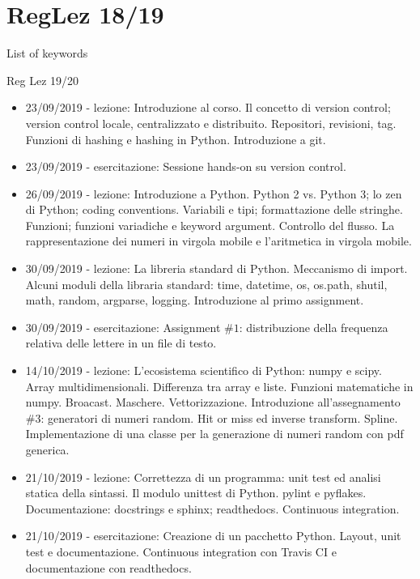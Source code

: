 \section{RegLez 18/19}

\begin{frame}[allowframebreaks]{List of keywords}
\listofkeywords
\end{frame}

\begin{frame}[allowframebreaks]{Reg Lez 19/20}
\begin{itemize}
\item 23/09/2019 - lezione: Introduzione al corso. Il concetto di version control; version control locale, centralizzato e distribuito. Repositori, revisioni, tag. Funzioni di hashing e hashing in Python. Introduzione a git.
\item 23/09/2019 - esercitazione: Sessione hands-on su version control.
\item 26/09/2019 - lezione: Introduzione a Python. Python 2 vs. Python 3; lo zen di Python; coding conventions. Variabili e tipi; formattazione delle stringhe. Funzioni; funzioni variadiche e keyword argument. Controllo del flusso. La rappresentazione dei numeri in virgola mobile e l'aritmetica in virgola mobile.
\item 30/09/2019 - lezione: La libreria standard di Python. Meccanismo di import. Alcuni moduli della libraria standard: time, datetime, os, os.path, shutil, math, random, argparse, logging. Introduzione al primo assignment.
\item 30/09/2019 - esercitazione: Assignment $\#1$: distribuzione della frequenza relativa delle lettere in un file di testo.
\item 14/10/2019 - lezione: L'ecosistema scientifico di Python: numpy e scipy. Array multidimensionali. Differenza tra array e liste. Funzioni matematiche in numpy. Broacast. Maschere. Vettorizzazione. Introduzione all'assegnamento $\#3$: generatori di numeri random. Hit or miss ed inverse transform. Spline. Implementazione di una classe per la generazione di numeri random con pdf generica.
\item 21/10/2019 - lezione: Correttezza di un programma: unit test ed analisi statica della sintassi. Il modulo unittest di Python. pylint e pyflakes. Documentazione: docstrings e sphinx; readthedocs. Continuous integration.
\item 21/10/2019 - esercitazione: Creazione di un pacchetto Python. Layout, unit test e documentazione. Continuous integration con Travis CI e documentazione con readthedocs.

\end{itemize}
\end{frame}
